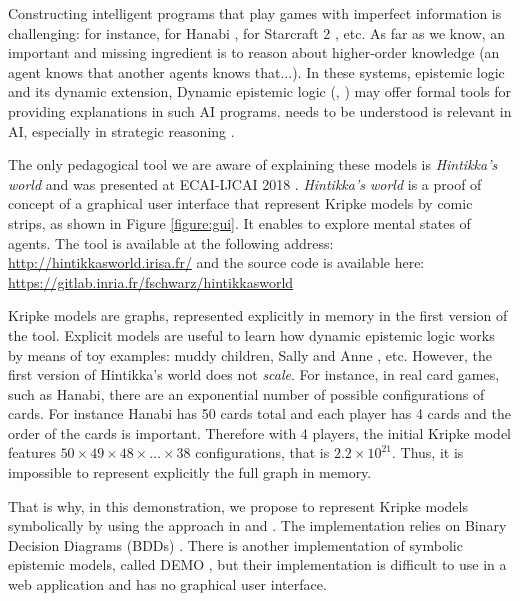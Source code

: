 Constructing intelligent programs that play games with imperfect information is challenging: for instance, for Hanabi \cite{DBLP:journals/corr/abs-1902-00506}, for Starcraft 2 \cite{DBLP:conf/ijcai/HuLLPX18}, etc. As far as we know, an important and missing ingredient is to reason about higher-order knowledge (an agent knows that another agents knows that...). In these systems, epistemic logic and its dynamic extension, Dynamic epistemic logic (\cite{baltag1998logic}, \cite{DitmarschvdHoekKooi}) may offer formal tools for providing explanations in such AI programs. needs to be understood is relevant in AI, especially in strategic reasoning \cite{DBLP:journals/ijgt/Aumann99}.

The only pedagogical tool we are aware of explaining these models is \emph{Hintikka's world} and was presented at ECAI-IJCAI 2018 \cite{DBLP:conf/ijcai/Schwarzentruber18}. 
\emph{Hintikka's world} is a proof of concept of a graphical user interface that represent Kripke models by  comic strips, as shown in Figure \ref{figure:gui}. It enables to explore mental states of agents. The tool is available at the following address:
\url{http://hintikkasworld.irisa.fr/} and the source code is available here:
\url{https://gitlab.inria.fr/fschwarz/hintikkasworld}


Kripke models are graphs, represented explicitly in memory in the first version of the tool. Explicit models are useful to learn how dynamic epistemic logic works by means of toy examples: muddy children, Sally and Anne  \cite{wimmer1983beliefs}, etc.  However, the first version of Hintikka's world does not \emph{scale}. For instance, in real card games, such as Hanabi, there are an exponential number of possible configurations of cards. For instance Hanabi has 50 cards total and each player has 4 cards and the order of the cards is important. Therefore with 4 players, the initial Kripke model features $50 \times 49 \times 48 \times \dots \times 38$ configurations, that is $2.2 \times 10^{21}$. Thus, it is impossible to represent explicitly the full graph in memory.



That is why, in this demonstration, we propose to represent Kripke models symbolically by using the approach in \cite{DBLP:conf/atal/CharrierS17} and \cite{DBLP:conf/aiml/CharrierS18}. The implementation relies on Binary Decision Diagrams (BDDs) \cite{DBLP:journals/tc/Bryant86}. There is another implementation of symbolic epistemic models, called DEMO \cite{DBLP:conf/lori/BenthemEGS15}, but their implementation is difficult to use in a web application and has no graphical user interface. %






